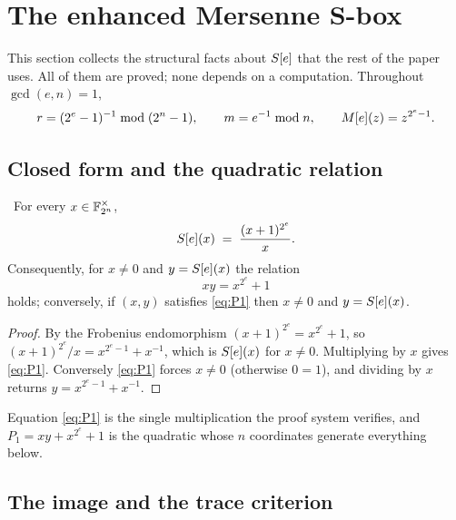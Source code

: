 \section{The enhanced Mersenne S-box}\label{sec:sbox}

This section collects the structural facts about $S[e]$ that the rest of the paper uses. All of
them are proved; none depends on a computation. Throughout $\gcd(e,n)=1$,
\[
  r=(2^e-1)^{-1}\bmod (2^n-1),\qquad m=e^{-1}\bmod n,\qquad M[e](z)=z^{2^e-1} .
\]

\subsection{Closed form and the quadratic relation}

\begin{proposition}\label{prop:closed}
\Proved\ For every $x\in\mathbb{F}_{2^n}^\times$,
\[
  S[e](x)\;=\;\frac{(x+1)^{2^e}}{x} .
\]
Consequently, for $x\ne0$ and $y=S[e](x)$ the relation
\begin{equation}\label{eq:P1}
  xy=x^{2^e}+1
\end{equation}
holds; conversely, if $(x,y)$ satisfies \eqref{eq:P1} then $x\ne0$ and $y=S[e](x)$.
\end{proposition}
\begin{proof}
By the Frobenius endomorphism $(x+1)^{2^e}=x^{2^e}+1$, so $(x+1)^{2^e}/x=x^{2^e-1}+x^{-1}$, which is
$S[e](x)$ for $x\ne0$. Multiplying by $x$ gives \eqref{eq:P1}. Conversely \eqref{eq:P1} forces
$x\ne0$ (otherwise $0=1$), and dividing by $x$ returns $y=x^{2^e-1}+x^{-1}$.
\end{proof}

Equation \eqref{eq:P1} is the single multiplication the proof system verifies, and $P_1=xy+x^{2^e}+1$
is the quadratic whose $n$ coordinates generate everything below.

\subsection{The image and the trace criterion}

